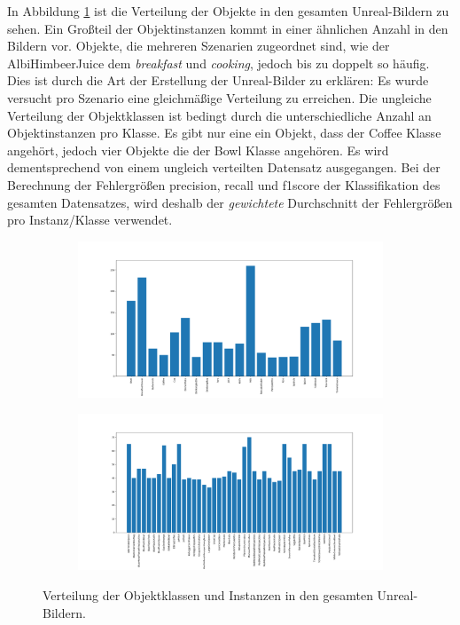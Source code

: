 In Abbildung \ref{fig:Unreal-Images_analysis} ist die Verteilung der Objekte in den gesamten Unreal-Bildern zu sehen. Ein Großteil der Objektinstanzen kommt in einer ähnlichen Anzahl in den Bildern vor. Objekte, die mehreren Szenarien zugeordnet sind, wie der AlbiHimbeerJuice dem \textit{breakfast} und \textit{cooking}, jedoch bis zu doppelt so häufig. Dies ist durch die Art der Erstellung der Unreal-Bilder zu erklären: Es wurde versucht pro Szenario eine gleichmäßige Verteilung zu erreichen. \newline
Die ungleiche Verteilung der Objektklassen ist bedingt durch die unterschiedliche Anzahl an Objektinstanzen pro Klasse. Es gibt nur eine ein Objekt, dass der Coffee Klasse angehört, jedoch vier Objekte die der Bowl Klasse angehören. \newline
Es wird dementsprechend von einem ungleich verteilten Datensatz ausgegangen. Bei der Berechnung der Fehlergrößen \gls{precision}, \gls{recall} und \gls{f1score} der Klassifikation des gesamten Datensatzes, wird deshalb der \textit{gewichtete} Durchschnitt der Fehlergrößen pro Instanz/Klasse verwendet. 

\begin{figure}
\centering
	\begin{subfigure}[b]{\textwidth}
		\includegraphics[width=\textwidth]{img/chapter6/UnrealGTClass_analysis.png}
	\end{subfigure}
	\begin{subfigure}[b]{\textwidth}
		\includegraphics[width=\textwidth]{img/chapter6/UnrealGTInstance_analysis.png}	
	\end{subfigure}
\caption[Verteilung der Objekte in den Unreal-Bildern]{Verteilung der Objektklassen und Instanzen in den gesamten Unreal-Bildern.}
\label{fig:Unreal-Images_analysis}
\end{figure}



